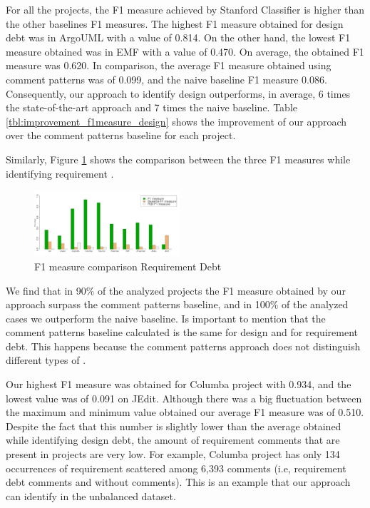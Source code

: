 For all the projects, the F1 measure achieved by Stanford Classifier is higher than the other baselines F1 measures. The highest F1 measure obtained for design debt was in ArgoUML with a value of 0.814. On the other hand, the lowest F1 measure obtained was in EMF with a value of 0.470. On average, the obtained F1 measure was 0.620. In comparison, the average F1 measure obtained using comment patterns was of 0.099, and the naive baseline F1 measure 0.086. Consequently, our approach to identify design \SATD outperforms, in average, 6 times the state-of-the-art approach and 7 times the naive baseline. Table \ref{tbl:improvement_f1measure_design} shows the improvement of our approach over the comment patterns baseline for each project. 
 
Similarly, Figure \ref{fig:f1_measure_comparison_requeriment} shows the comparison between the three F1 measures while identifying requirement \SATD.

\begin{figure}[thb!]
  \centering
  \includegraphics[width=0.48\textwidth]{figures/f1_measure_comparison_requirement_2.pdf}
  \vspace{-3mm}
  \caption{F1 measure comparison Requirement Debt}
  \label{fig:f1_measure_comparison_requeriment}
\end{figure}

We find that in 90\% of the analyzed projects the F1 measure obtained by our approach surpass the comment patterns baseline, and in 100\% of the analyzed cases we outperform the naive baseline. Is important to mention that the comment patterns baseline calculated is the same for design and for requirement debt. This happens because the comment patterns approach does not distinguish different types of \SATD. 

Our highest F1 measure was obtained for Columba project with 0.934, and the lowest value was of 0.091 on JEdit. Although there was a big fluctuation between the maximum and minimum value obtained our average F1 measure was of 0.510. Despite the fact that this number is slightly lower than the average obtained while  identifying design debt, the amount of requirement \SATD comments that are present in projects are very low. For example, Columba project has only 134 occurrences of requirement \SATD scattered among 6,393 comments (i.e, requirement debt comments and without \SATD comments). This is an example that our approach can identify \SATD in the unbalanced dataset. 

